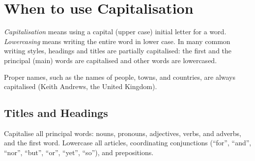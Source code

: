 \section{When to use Capitalisation}

\emph{Capitalisation} means using a capital (upper case) initial
letter for a word. \emph{Lowercasing} means writing the entire word in
lower case. In many common writing styles, headings and titles are
partially capitalised: the first and the principal (main) words are
capitalised and other words are lowercased.

Proper names, such as the names of people, towns, and countries, are
always capitalised (Keith Andrews, the United Kingdom).



\subsection{Titles and Headings}

Capitalise all principal words: nouns, pronouns, adjectives, verbs,
and adverbs, and the first word. Lowercase all articles, coordinating
conjunctions (``for'', ``and'', ``nor'', ``but'', ``or'', ``yet'',
``so''), and prepositions.

